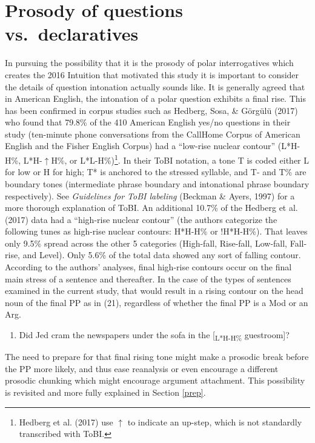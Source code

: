 \documentclass[11pt,oneside]{book}
\providecommand{\tightlist}{%
  \setlength{\itemsep}{0pt}\setlength{\parskip}{0pt}}
\let\rmarkdownfootnote\footnote%
\def\footnote{\protect\rmarkdownfootnote}
\begin{document}
\hypertarget{prosody-of-questions-vs.-declaratives}{%
\section{Prosody of questions vs.~declaratives}\label{prosody-of-questions-vs.-declaratives}}

In pursuing the possibility that it is the prosody of polar interrogatives which creates the 2016 Intuition that motivated this study it is important to consider the details of question intonation actually sounds like. It is generally agreed that in American English, the intonation of a polar question exhibits a final rise. This has been confirmed in corpus studies such as Hedberg, Sosa, \& Görgülü (2017) who found that 79.8\% of the 410 American English yes/no questions in their study (ten-minute phone conversations from the CallHome Corpus of American English and the Fisher English Corpus) had a ``low-rise nuclear contour'' (L*H-H\%, L*H-\(\uparrow\)H\%, or L*L-H\%)\footnote{Hedberg et al. (2017) use \(\uparrow\) to indicate an up-step, which is not standardly transcribed with ToBI.}. In their ToBI notation, a tone T is coded either L for low or H for high; T* is anchored to the stressed syllable, and T- and T\% are boundary tones (intermediate phrase boundary and intonational phrase boundary respectively). See \emph{Guidelines for ToBI labeling} (Beckman \& Ayers, 1997) for a more thorough explanation of ToBI. An additional 10.7\% of the Hedberg et al. (2017) data had a ``high-rise nuclear contour'' (the authors categorize the following tunes as high-rise nuclear contours: H*H-H\% or !H*H-H\%). That leaves only 9.5\% spread across the other 5 categories (High-fall, Rise-fall, Low-fall, Fall-rise, and Level). Only 5.6\% of the total data showed any sort of falling contour. According to the authors' analyses, final high-rise contours occur on the final main stress of a sentence and thereafter. In the case of the types of sentences examined in the current study, that would result in a rising contour on the head noun of the final PP as in (21), regardless of whether the final PP is a Mod or an Arg.

\begin{enumerate}
\def\labelenumi{(\arabic{enumi})}
\setcounter{enumi}{20}
\tightlist
\item
  Did Jed cram the newspapers under the sofa in the {[}\textsubscript{L*H-H\%} guestroom{]}?
\end{enumerate}

The need to prepare for that final rising tone might make a prosodic break before the PP more likely, and thus ease reanalysis or even encourage a different prosodic chunking which might encourage argument attachment. This possibility is revisited and more fully explained in Section \ref{prep}.
\end{document}
